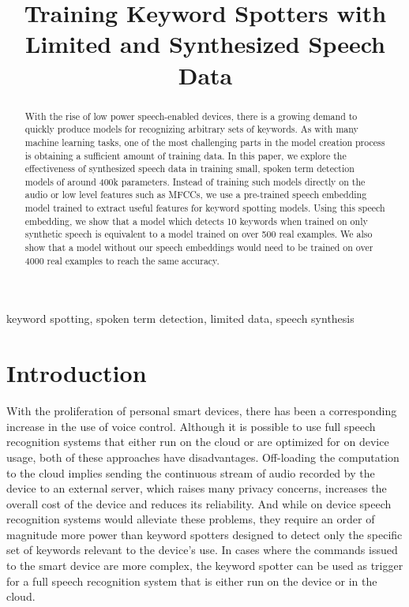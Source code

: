 \documentclass{article}
\title{Training Keyword Spotters with Limited and Synthesized Speech Data}
\begin{document}
\maketitle
\begin{abstract}
With the rise of low power speech-enabled devices, there is a growing demand to quickly produce models for recognizing arbitrary sets of keywords. As with many machine learning tasks, one of the most challenging parts in the model creation process is obtaining a sufficient amount of training data. In this paper, we explore the effectiveness of synthesized speech data in training small, spoken term detection models of around 400k parameters. Instead of training such models directly on the audio or low level features such as MFCCs, we use a pre-trained speech embedding model trained to extract useful features for keyword spotting models. Using this speech embedding, we show that a model which detects 10 keywords when trained on only synthetic speech is equivalent to a model trained on over 500 real examples. We also show that a model without our speech embeddings would need to be trained on over 4000 real examples to reach the same accuracy.
\end{abstract}
\begin{keywords}
keyword spotting, spoken term detection, limited data, speech synthesis
\end{keywords}



\section{Introduction}
\label{sec:intro}

With the proliferation of personal smart devices, there has been a corresponding increase in the use of voice control. Although it is possible to use full speech recognition systems that either run on the cloud or are optimized for on device usage, both of these approaches have disadvantages. Off-loading the computation to the cloud implies sending the continuous stream of audio recorded by the device to an external server, which raises many privacy concerns, increases the overall cost of the device and reduces its reliability.
And while on device speech recognition systems would alleviate these problems, they require an order of magnitude more power than keyword spotters designed to detect only the specific set of keywords relevant to the device's use. In cases where the commands issued to the smart device are more complex, the keyword spotter can be used as trigger for a full speech recognition system that is either run on the device or in the cloud.
\end{document}
